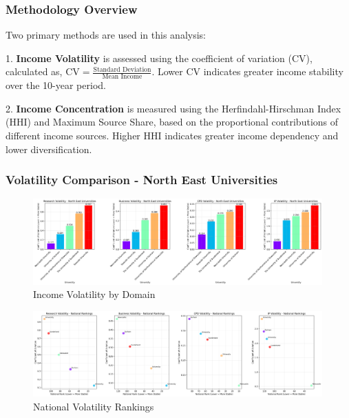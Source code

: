 \documentclass[journal,onecolumn, 10pt,draftclsnofoot]{IEEEtran}
\begin{document}
\subsubsection{Methodology Overview}

Two primary methods are used in this analysis:

1. \textbf{Income Volatility} is assessed using the coefficient of variation (CV), calculated as, $\mathrm{CV}=\frac{\text{Standard Deviation}}{\text{Mean Income}}$. Lower CV indicates greater income stability over the 10-year period.

2. \textbf{Income Concentration} is measured using the Herfindahl-Hirschman Index (HHI) and Maximum Source Share, based on the proportional contributions of different income sources. Higher HHI indicates greater income dependency and lower diversification.

\subsubsection{Volatility Comparison - North East Universities}

\begin{figure}[h]
\centering
\includegraphics[width=0.99\textwidth]{Fig/figure41.ne_volatility_comparison.png}
\caption{Income Volatility by Domain}
\label{fig:ne-volatility-comparison}
\end{figure}

\begin{figure}[h]
\centering
\includegraphics[width=0.99\textwidth]{Fig/figure42.national_volatility_rankings.png}
\caption{National Volatility Rankings}
\label{fig:national-volatility-rankings}
\end{figure}
\end{document}
